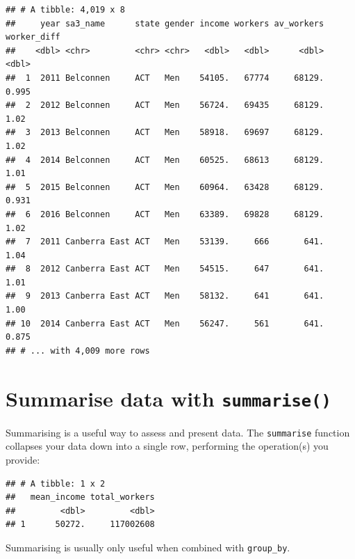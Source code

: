 \documentclass[]{book}
\newenvironment{Shaded}{\begin{snugshade}}{\end{snugshade}}
\newcommand{\CommentTok}[1]{\textcolor[rgb]{0.56,0.35,0.01}{\textit{#1}}}
\newcommand{\DataTypeTok}[1]{\textcolor[rgb]{0.13,0.29,0.53}{#1}}
\newcommand{\KeywordTok}[1]{\textcolor[rgb]{0.13,0.29,0.53}{\textbf{#1}}}
\newcommand{\NormalTok}[1]{#1}
\newcommand{\OperatorTok}[1]{\textcolor[rgb]{0.81,0.36,0.00}{\textbf{#1}}}
\newcommand{\StringTok}[1]{\textcolor[rgb]{0.31,0.60,0.02}{#1}}
\begin{document}
\begin{verbatim}
## # A tibble: 4,019 x 8
##     year sa3_name      state gender income workers av_workers worker_diff
##    <dbl> <chr>         <chr> <chr>   <dbl>   <dbl>      <dbl>       <dbl>
##  1  2011 Belconnen     ACT   Men    54105.   67774     68129.       0.995
##  2  2012 Belconnen     ACT   Men    56724.   69435     68129.       1.02 
##  3  2013 Belconnen     ACT   Men    58918.   69697     68129.       1.02 
##  4  2014 Belconnen     ACT   Men    60525.   68613     68129.       1.01 
##  5  2015 Belconnen     ACT   Men    60964.   63428     68129.       0.931
##  6  2016 Belconnen     ACT   Men    63389.   69828     68129.       1.02 
##  7  2011 Canberra East ACT   Men    53139.     666       641.       1.04 
##  8  2012 Canberra East ACT   Men    54515.     647       641.       1.01 
##  9  2013 Canberra East ACT   Men    58132.     641       641.       1.00 
## 10  2014 Canberra East ACT   Men    56247.     561       641.       0.875
## # ... with 4,009 more rows
\end{verbatim}

\hypertarget{summarise-data-with-summarise}{%
\section{\texorpdfstring{Summarise data with \texttt{summarise()}}{Summarise data with summarise()}}\label{summarise-data-with-summarise}}

Summarising is a useful way to assess and present data. The \texttt{summarise} function collapses your data down into a single row, performing the operation(s) you provide:

\begin{Shaded}
\end{Shaded}

\begin{verbatim}
## # A tibble: 1 x 2
##   mean_income total_workers
##         <dbl>         <dbl>
## 1      50272.     117002608
\end{verbatim}

Summarising is usually only useful when combined with \texttt{group\_by}.
\end{document}
